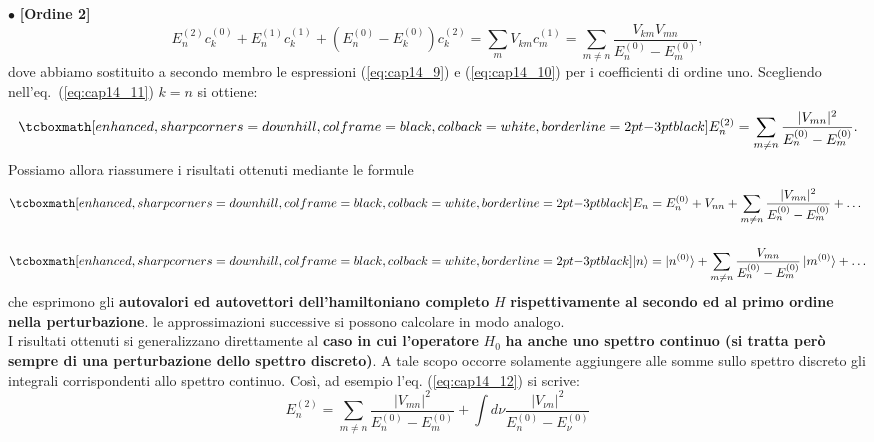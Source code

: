 $\bullet$ \textbf{[Ordine 2]}\\
	\begin{equation}
			E_n^{(2)}c_k^{(0)}+E_n^{(1)}c_k^{(1)}+ \left( E_n^{(0)}-E_k ^{(0)}\right) c_k^{(2)}  = \sum _m V_{km} c_m ^{(1)} = \sum _{m\neq n} \frac{V_{km} V_{mn}}{E_n^{(0)}-E_m ^{(0)}},
	\label{eq:cap14_11}
	\end{equation}
dove abbiamo sostituito a secondo membro le espressioni (\ref{eq:cap14_9}) e (\ref{eq:cap14_10}) per i coefficienti di ordine uno. Scegliendo nell'eq.~(\ref{eq:cap14_11}) $k=n$ si ottiene:
	\begin{equation}
		\tcboxmath[enhanced, sharp corners=downhill, colframe=black, colback=white, borderline={2pt}{-3pt}{black}]{
			E_n ^{(2)} = \sum _{m \neq n } \frac{\vert V_{mn} \vert ^2}{E_n ^{(0)}-E_m ^{(0)}}.
			}
	\label{eq:cap14_12}
	\end{equation}
Possiamo allora riassumere i risultati ottenuti mediante le formule
	\begin{align}
		& \tcboxmath[enhanced, sharp corners=downhill, colframe=black, colback=white, borderline={2pt}{-3pt}{black}]{
			E_n = E_n ^{(0)}+ V_{nn} +\sum _{m \neq n } \frac{\vert V_{mn} \vert ^2}{E_n ^{(0)}-E_m ^{(0)}}+ \dots
			} \\[0.5cm]
		& \tcboxmath[enhanced, sharp corners=downhill, colframe=black, colback=white, borderline={2pt}{-3pt}{black}]{
 			\vert n \rangle = \vert n^{(0)} \rangle +\sum _{m \neq n } \frac{V_{mn} }{E_n ^{(0)}-E_m ^{(0)}}\, \vert m^{(0)}\rangle+ \dots 
			 }
	\end{align}
che esprimono gli \textbf{autovalori ed autovettori dell'hamiltoniano completo} $H$ \textbf{rispettivamente al secondo ed al primo ordine nella perturbazione}. le approssimazioni successive si possono calcolare in modo analogo.\\

I risultati ottenuti si generalizzano direttamente al \textbf{caso in cui l'operatore} $H_0$ \textbf{ha anche uno spettro continuo (si tratta però sempre di una perturbazione dello spettro discreto)}. A tale scopo occorre solamente aggiungere alle somme sullo spettro discreto gli integrali corrispondenti allo spettro continuo. Così, ad esempio l'eq. (\ref{eq:cap14_12}) si scrive:
	\begin{equation}
		E_n ^{(2)} = \sum _{m \neq n} \frac{\vert V_{mn} \vert ^2}{E_n ^{(0)}-E_m ^{(0)}}+ \int d\nu \frac{\vert V_{\nu n} \vert ^2}{E_n ^{(0)}-E_{\nu} ^{(0)}} 
	\end{equation}
